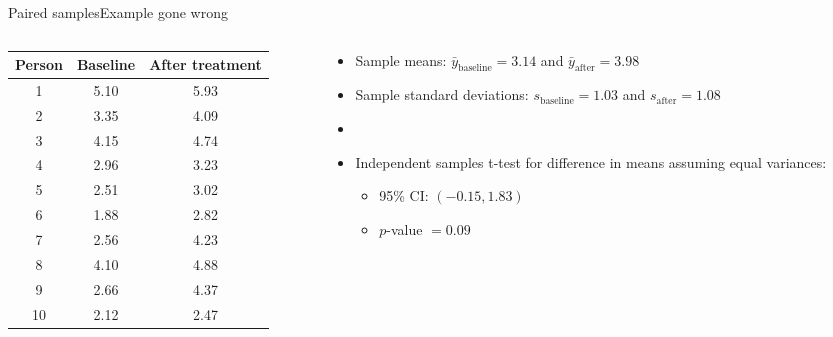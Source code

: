 \documentclass[xcolor=dvipsnames]{beamer}
\begin{document}
\begin{frame}{Paired samples}{Example gone wrong}
	\begin{columns}
		\begin{column}{.5 \textwidth}
					{\scriptsize
	\begin{tabular}{|c|c|c|}
		\hline
		\textbf{Person} & \textbf{Baseline} &  \textbf{After treatment} \\ \hline \hline
		1  &    5.10 &   5.93  \\ \hline 
		2  &    3.35 &   4.09 \\ \hline 
		3  &   4.15  &  4.74  \\ \hline 
		4  &   2.96  &  3.23  \\ \hline 
		5  &    2.51 &   3.02 \\ \hline 
		6  &   1.88  &  2.82  \\ \hline 
		7  &   2.56  &  4.23 \\ \hline 
		8  &    4.10 &   4.88 \\ \hline 
		9  &   2.66  &  4.37  \\ \hline 
		10  &    2.12  &  2.47 \\ \hline 
	\end{tabular}
}
		\end{column}
	\begin{column}{.5 \textwidth}
		\begin{itemize}
			\item Sample means: $\bar{y}_{\text{baseline}} = 3.14$ and $\bar{y}_{\text{after}} = 3.98$ \pause
			\item Sample standard deviations: $s_{\text{baseline}} = 1.03$ and $s_{\text{after}} = 1.08$ \pause
			\item[]
			\item Independent samples t-test for difference in means assuming equal variances: \pause
			\begin{itemize}
				\item 95\% CI: $(-0.15,  1.83)$ \pause
				\item $p$-value $=0.09$
			\end{itemize}
		\end{itemize}
	\end{column}
	\end{columns}
\end{frame}
\end{document}
